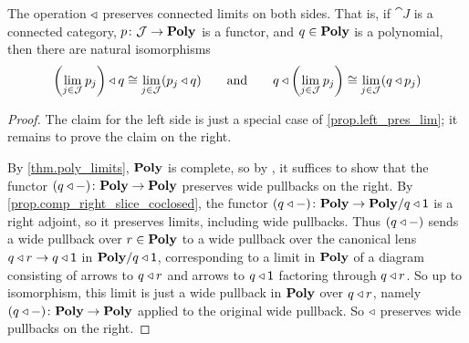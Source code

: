 \documentclass[Book-Poly]{subfiles}
\begin{document}
\begin{theorem}\label{thm.connected_limits}
The operation $\mathbin{\triangleleft}$ preserves connected limits on both sides.
That is, if $\cat{J}$ is a connected category, $p\colon \mathcal{J}\to\mathbf{Poly}$ is a functor, and $q\in\mathbf{Poly}$ is a polynomial, then there are natural isomorphisms
\[
	\left(\lim_{j\in \mathcal{J}} p_j\right)\mathbin{\triangleleft} q\cong \lim_{j\in \mathcal{J}}(p_j\mathbin{\triangleleft} q)
	\qquad\text{and}\qquad
	q\mathbin{\triangleleft}\left(\lim_{j\in \mathcal{J}} p_j\right)\cong \lim_{j\in \mathcal{J}}(q\mathbin{\triangleleft} p_j)
\]
\end{theorem}
\begin{proof}
The claim for the left side is just a special case of \cref{prop.left_pres_lim}; it remains to prove the claim on the right.

By \cref{thm.poly_limits}, $\mathbf{Poly}$ is complete, so by \cite[Theorem~4.3]{nlab:connected-limit}, it suffices to show that the functor $(q\mathbin{\triangleleft}-)\colon\mathbf{Poly}\to\mathbf{Poly}$ preserves wide pullbacks on the right.
By \cref{prop.comp_right_slice_coclosed}, the functor $(q\mathbin{\triangleleft}-)\colon\mathbf{Poly}\to\mathbf{Poly}/q\mathbin{\triangleleft}\textsf{1}$ is a right adjoint, so it preserves limits, including wide pullbacks.
Thus $(q\mathbin{\triangleleft}-)$ sends a wide pullback over $r\in\mathbf{Poly}$ to a wide pullback over the canonical lens $q\mathbin{\triangleleft} r\to q\mathbin{\triangleleft}\textsf{1}$ in $\mathbf{Poly}/q\mathbin{\triangleleft}\textsf{1}$, corresponding to a limit in $\mathbf{Poly}$ of a diagram consisting of arrows to $q\mathbin{\triangleleft} r$ and arrows to $q\mathbin{\triangleleft}\textsf{1}$ factoring through $q\mathbin{\triangleleft} r$.
So up to isomorphism, this limit is just a wide pullback in $\mathbf{Poly}$ over $q\mathbin{\triangleleft} r$, namely $(q\mathbin{\triangleleft}-)\colon\mathbf{Poly}\to\mathbf{Poly}$ applied to the original wide pullback.
So $\mathbin{\triangleleft}$ preserves wide pullbacks on the right.
\end{proof}
\end{document}
